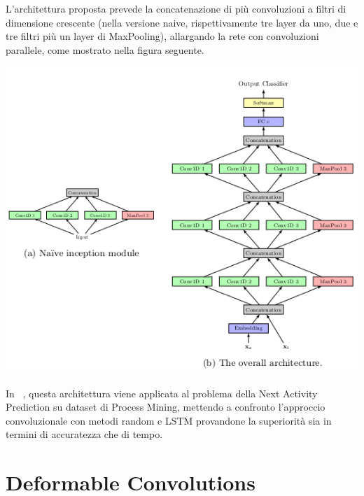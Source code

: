 \documentclass[12pt,a4paper]{report}
\begin{document}
        \medskip
        L'architettura proposta prevede la concatenazione di
        pi\`u convoluzioni a filtri di dimensione crescente 
        (nella versione naive, rispettivamente tre layer da
        uno, due e tre filtri pi\`u un layer di MaxPooling),
        allargando la rete con convoluzioni parallele, come mostrato 
        nella figura seguente.

        \begin{center} \label{fig:inception}
            \includegraphics[width=15cm]{inception}
        \end{center}
        
        \medskip
        In ~\cite{10.1007/978-3-030-35166-3_25}, questa architettura 
        viene applicata al problema della Next Activity Prediction
        su dataset di Process Mining, mettendo a confronto
        l'approccio convoluzionale con metodi random e LSTM
        provandone la superiorit\`a sia in termini di accuratezza che 
        di tempo. 

        \newpage
        \section{Deformable Convolutions}
\end{document}
